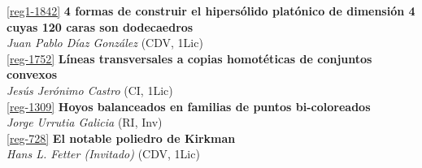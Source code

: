 \begin{multicols}{2}
\noindent  \ref{reg1-1842}  {\bfseries 4 formas de construir el hipers\'olido plat\'onico de dimensi\'on 4 cuyas 120 caras son dodecaedros}\\
{\slshape  Juan Pablo D\'iaz Gonz\'alez} {\footnotesize (CDV, 1Lic)}\\

\noindent  \ref{reg-1752}  {\bfseries L\'ineas transversales a copias homot\'eticas de conjuntos convexos}\\
{\slshape  Jes\'us  Jer\'onimo Castro} {\footnotesize (CI, 1Lic)}\\

\noindent  \ref{reg-1309}  {\bfseries Hoyos balanceados en familias de puntos bi-coloreados}\\
{\slshape  Jorge  Urrutia Galicia} {\footnotesize (RI, Inv)}\\

\noindent  \ref{reg-728}  {\bfseries El notable poliedro de Kirkman}\\
{\slshape  Hans L. Fetter (Invitado)} {\footnotesize (CDV, 1Lic)}\\

\end{multicols}
